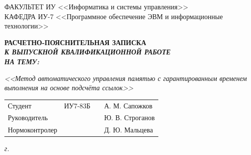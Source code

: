 \begin{titlepage}
	{
		\small \raggedright
		ФАКУЛЬТЕТ ИУ <<Информатика и системы управления>> \\
		\vspace{3.3mm}
		КАФЕДРА ИУ-7 <<Программное обеспечение ЭВМ и информационные технологии>> \\
	}
	
	\vspace{20.8mm}
	
	{
		\LARGE \bfseries
		РАСЧЕТНО-ПОЯСНИТЕЛЬНАЯ ЗАПИСКА \\
	}
	\vspace{5mm}
	{
		\Large \bfseries \itshape
		К ВЫПУСКНОЙ КВАЛИФИКАЦИОННОЙ РАБОТЕ \\
		\vspace{5mm}
		НА ТЕМУ: \\
	}
	
	{
		\Large \itshape
		<<Метод автоматического управления памятью с гарантированным временем выполнения на основе подсчёта ссылок>>
	}
	
	\vfill
	
	\begin{tabular}{p{}PPT}
		Студент &  ИУ7-83Б & \uline{} & А. М. Сапожков \\
		Руководитель & ~ &  \uline{} & Ю. В. Строганов \\
		Нормоконтролер & ~ &  \uline{} & Д. Ю. Мальцева \\
	\end{tabular}
	
	\vspace{14mm}
	
	\textit{{\the\year} г.}
	
\end{titlepage}